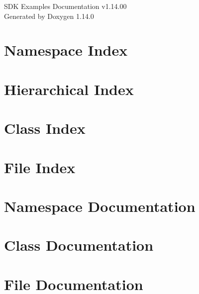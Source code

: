 \documentclass[twoside]{book}
\newcommand{\+}{\discretionary{\mbox{\scriptsize$\hookleftarrow$}}{}{}}
\newcommand{\clearemptydoublepage}{%
    \newpage{\pagestyle{empty}\cleardoublepage}%
  }
\begin{document}
  \raggedbottom
    \hypersetup{pageanchor=false,
                bookmarksnumbered=true,
                pdfencoding=unicode
               }
  \begin{titlepage}
  \vspace*{7cm}
  \begin{center}%
  {\Large SDK Examples Documentation v1.\+14.\+00}\\
  \vspace*{1cm}
  {\large Generated by Doxygen 1.14.0}\\
  \end{center}
  \end{titlepage}
  \clearemptydoublepage
  \tableofcontents
  \clearemptydoublepage
  \hypersetup{pageanchor=true}
\chapter{Namespace Index}

\chapter{Hierarchical Index}

\chapter{Class Index}

\chapter{File Index}

\chapter{Namespace Documentation}

\chapter{Class Documentation}


\chapter{File Documentation}













  \backmatter
  \newpage
  \clearemptydoublepage
  \printindex
\end{document}
